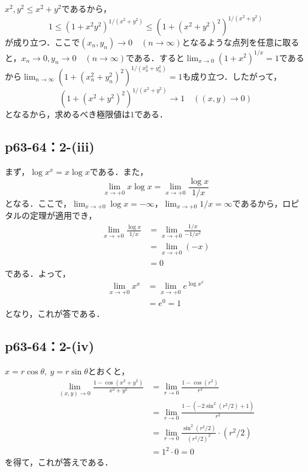 \documentclass[a4paper,10pt,fleqn]{ltjsarticle}
\begin{document}
  \begin{tleftbar}
    $x^2,y^2 \leq x^2+y^2$であるから，
    \[
      1 \leq (1 + x^2 y^2)^{1/(x^2+y^2)} \leq (1 + (x^2+y^2)^2)^{1/(x^2+y^2)}
    \]
    が成り立つ．ここで$(x_n, y_n) \to 0 \quad (n \to \infty)$となるような点列を任意に取ると，$x_n \to 0, y_n \to 0 \quad (n \to \infty)$である．すると$\lim_{x \to 0} (1+x^2)^{1/x} = 1$であるから$\lim_{n \to \infty} (1 + (x_n^2+y_n^2)^2)^{1/(x_n^2+y_n^2)} = 1$も成り立つ．したがって，
    \[
      (1 + (x^2+y^2)^2)^{1/(x^2+y^2)} \to 1 \quad ((x,y) \to 0)
    \]
    となるから，求めるべき極限値は$1$である．
  \end{tleftbar}


\subsection*{p63-64：2-(iii)}

\begin{tleftbar}
    まず，$\log x^x = x \log x$である．また，
    \[
        \lim_{x \to +0} x \log x  =\lim_{x \to +0} \frac{\log x}{1/x} 
    \]
    となる．ここで，$\lim_{x \to +0} \log x = -\infty$，$\lim_{x \to +0} 1/x =\infty$であるから，ロピタルの定理が適用でき，
    \begin{align*}
        \lim_{x \to +0} \frac{\log x}{1/x} & = \lim_{x \to +0} \frac{1/x}{-1/x^2} \\
        & = \lim_{x \to +0} (-x) \\
        & =0
    \end{align*}
    である．よって，
    \begin{align*}
    \lim_{x \to +0} x^x &= \lim_{x \to +0} e^{\log x^x} \\
    & =e^0 =1
    \end{align*}
    となり，これが答である．
\end{tleftbar}

\subsection*{p63-64：2-(iv)}

\begin{tleftbar}
    $x=r \cos \theta,~y=r\sin \theta$とおくと，
    \begin{align*}
        \lim_{(x,y)\to 0} \frac{1-\cos (x^2+y^2)}{x^2+y^2} & = \lim_{r \to 0} \frac{1-\cos (r^2)}{r^2} \\
        & =\lim_{r \to 0} \frac{1-(-2\sin ^2 (r^2/2)+1)}{r^2} \\
        & =\lim_{r \to 0} \frac{\sin ^2 (r^2/2)}{(r^2/2)^2} \cdot (r^2/2) \\
        & = 1^2 \cdot 0 =0
    \end{align*}
    を得て，これが答えである．
\end{tleftbar}
\end{document}
